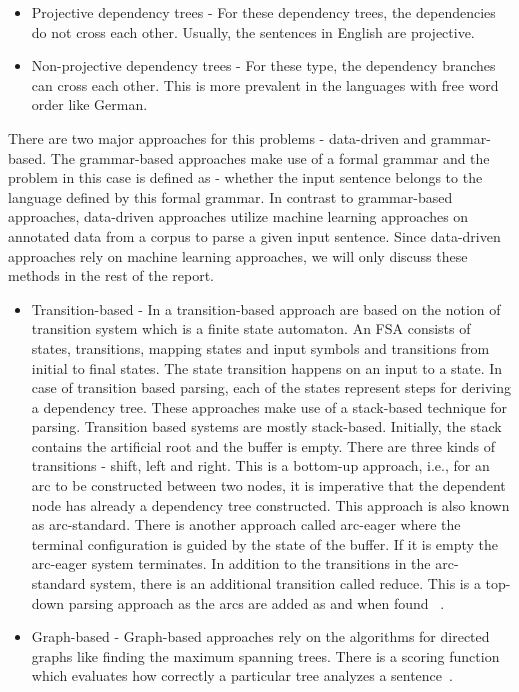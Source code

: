 \begin{itemize}
    \item Projective dependency trees - For these dependency trees, the dependencies do not cross each other. Usually, the sentences in English are projective.
    \item Non-projective dependency trees - For these type, the dependency branches can cross each other. This is more prevalent in the languages with free word order like German.
    
\end{itemize}


There are two major approaches for this problems - data-driven and grammar-based. The grammar-based approaches make use of a formal grammar and the problem in this case is defined as - whether the input sentence belongs to the language defined by this formal grammar. In contrast to grammar-based approaches, data-driven approaches utilize machine learning approaches on annotated data from a corpus to parse a given input sentence. Since data-driven approaches rely on machine learning approaches, we will only discuss these methods in the rest of the report.

\begin{itemize}
    \item{Transition-based - }{In a transition-based approach are based on the notion of transition system which is a finite state automaton. An FSA consists of states, transitions, mapping states and input symbols and transitions from initial to final states. The state transition happens on an input to a state. In case of transition based parsing, each of the states represent steps for deriving a dependency tree. These approaches make use of a stack-based technique for parsing. Transition based systems are mostly stack-based. Initially, the stack contains the artificial root and the buffer is empty. There are three kinds of transitions - shift, left and right. This is a bottom-up approach, i.e., for an arc to be constructed between two nodes, it is imperative that the dependent node has already a dependency tree constructed. This approach is also known as arc-standard. There is another approach called arc-eager where the terminal configuration is guided by the state of the buffer. If it is empty the arc-eager system terminates. In addition to the transitions in the arc-standard system, there is an additional transition called reduce. This is a top-down parsing approach as the arcs are added as and when found~ \cite{kubler2009dependency}.
    }
    \item{Graph-based - }{Graph-based approaches rely on the algorithms for directed graphs like finding the maximum spanning trees. There is a scoring function which evaluates how correctly a particular tree analyzes a sentence~\cite{kubler2009dependency}. }
\end{itemize}
 
